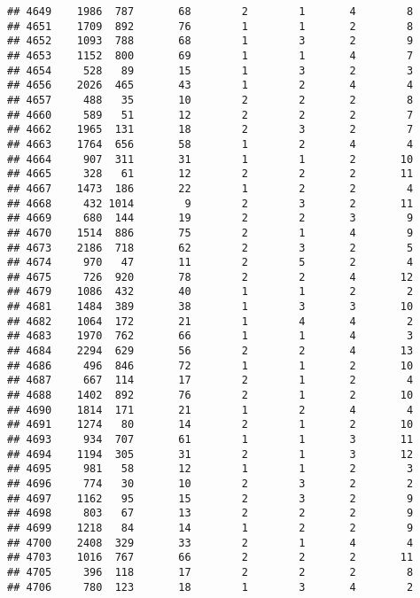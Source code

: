 \documentclass[]{article}
\begin{document}
\begin{verbatim}
## 4649    1986  787       68        2        1       4        8
## 4651    1709  892       76        1        1       2        8
## 4652    1093  788       68        1        3       2        9
## 4653    1152  800       69        1        1       4        7
## 4654     528   89       15        1        3       2        3
## 4656    2026  465       43        1        2       4        4
## 4657     488   35       10        2        2       2        8
## 4660     589   51       12        2        2       2        7
## 4662    1965  131       18        2        3       2        7
## 4663    1764  656       58        1        2       4        4
## 4664     907  311       31        1        1       2       10
## 4665     328   61       12        2        2       2       11
## 4667    1473  186       22        1        2       2        4
## 4668     432 1014        9        2        3       2       11
## 4669     680  144       19        2        2       3        9
## 4670    1514  886       75        2        1       4        9
## 4673    2186  718       62        2        3       2        5
## 4674     970   47       11        2        5       2        4
## 4675     726  920       78        2        2       4       12
## 4679    1086  432       40        1        1       2        2
## 4681    1484  389       38        1        3       3       10
## 4682    1064  172       21        1        4       4        2
## 4683    1970  762       66        1        1       4        3
## 4684    2294  629       56        2        2       4       13
## 4686     496  846       72        1        1       2       10
## 4687     667  114       17        2        1       2        4
## 4688    1402  892       76        2        1       2       10
## 4690    1814  171       21        1        2       4        4
## 4691    1274   80       14        2        1       2       10
## 4693     934  707       61        1        1       3       11
## 4694    1194  305       31        2        1       3       12
## 4695     981   58       12        1        1       2        3
## 4696     774   30       10        2        3       2        2
## 4697    1162   95       15        2        3       2        9
## 4698     803   67       13        2        2       2        9
## 4699    1218   84       14        1        2       2        9
## 4700    2408  329       33        2        1       4        4
## 4703    1016  767       66        2        2       2       11
## 4705     396  118       17        2        2       2        8
## 4706     780  123       18        1        3       4        2

\end{verbatim}
\end{document}
